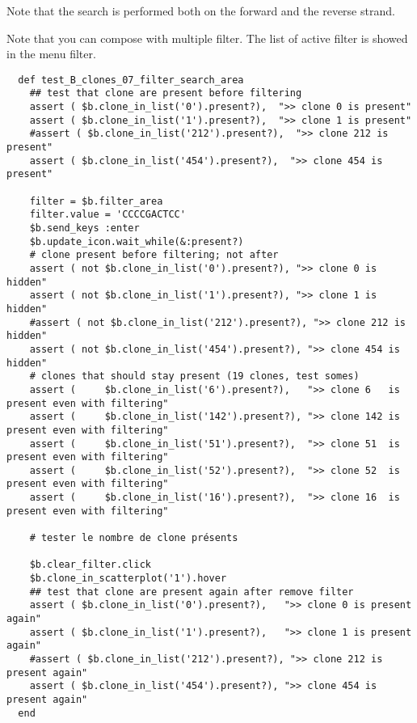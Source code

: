 Note that the search is performed both on the forward and the reverse strand.

Note that you can compose with multiple filter. 
The list of active filter is showed in the menu filter.
\begin{verbatim}
  def test_B_clones_07_filter_search_area
    ## test that clone are present before filtering
    assert ( $b.clone_in_list('0').present?),  ">> clone 0 is present"
    assert ( $b.clone_in_list('1').present?),  ">> clone 1 is present"
    #assert ( $b.clone_in_list('212').present?),  ">> clone 212 is present"
    assert ( $b.clone_in_list('454').present?),  ">> clone 454 is present"

    filter = $b.filter_area
    filter.value = 'CCCCGACTCC'
    $b.send_keys :enter
    $b.update_icon.wait_while(&:present?)
    # clone present before filtering; not after
    assert ( not $b.clone_in_list('0').present?), ">> clone 0 is hidden"
    assert ( not $b.clone_in_list('1').present?), ">> clone 1 is hidden"
    #assert ( not $b.clone_in_list('212').present?), ">> clone 212 is hidden"
    assert ( not $b.clone_in_list('454').present?), ">> clone 454 is hidden"
    # clones that should stay present (19 clones, test somes)
    assert (     $b.clone_in_list('6').present?),   ">> clone 6   is present even with filtering"
    assert (     $b.clone_in_list('142').present?), ">> clone 142 is present even with filtering"
    assert (     $b.clone_in_list('51').present?),  ">> clone 51  is present even with filtering"
    assert (     $b.clone_in_list('52').present?),  ">> clone 52  is present even with filtering"
    assert (     $b.clone_in_list('16').present?),  ">> clone 16  is present even with filtering"

    # tester le nombre de clone présents

    $b.clear_filter.click
    $b.clone_in_scatterplot('1').hover
    ## test that clone are present again after remove filter
    assert ( $b.clone_in_list('0').present?),   ">> clone 0 is present again"
    assert ( $b.clone_in_list('1').present?),   ">> clone 1 is present again"
    #assert ( $b.clone_in_list('212').present?), ">> clone 212 is present again"
    assert ( $b.clone_in_list('454').present?), ">> clone 454 is present again"
  end
\end{verbatim}  
\bigskip


